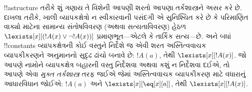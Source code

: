 \documentclass[../../../include/open-logic-section]{subfiles}
\begin{document}
\begin{digress}
!!a{structure} તરીકે શું ગણાય તે વિશેની આપણી શરતો આપણા તર્કશાસ્ત્રને
અસર કરે છે. દાખલા તરીકે, ખાલી વ્યાપકક્ષેત્રો ન સ્વીકારવાની પસંદગી એ સુનિશ્ચિત
કરે છે કે પરિમાણિત વાક્યો માટેના સામાન્ય સંતોષવિવરણ (અથવા
સત્યતાવિવરણ) હેઠળ $\lexists[x][(!A(x) \lor \lnot !A(x))]$
પ્રમાણભૂત---એટલે કે તાર્કિક સત્ય---છે. અને બધાં !!{constant}s વ્યાપકક્ષેત્રની
કોઈ વસ્તુને નિર્દેશે જ એવી શરત અસ્તિત્વવાચક વ્યાપકીકરણને અનુમાનનો
સુદૃઢ ઢાંચો બનાવે છે: $!A(a)$, તેથી $\lexists[x][!A(x)]$. જો આપણે
નામોને વ્યાપકક્ષેત્ર બહારની વસ્તુ નિર્દેશવા અથવા કશું ન નિર્દેશવા દઈએ, તો
આપણે એવા \emph{મુક્ત તર્કશાસ્ત્ર} તરફ જઈએ જેમાં અસ્તિત્વવાચક
વ્યાપકીકરણ માટે વધારાનું આધારવિધાન જોઈએ: $!A(a)$ અને
$\lexists[x][\eq[x][a]]$, તેથી $\lexists[x][!A(x)]$.
\end{digress}
\end{document}
